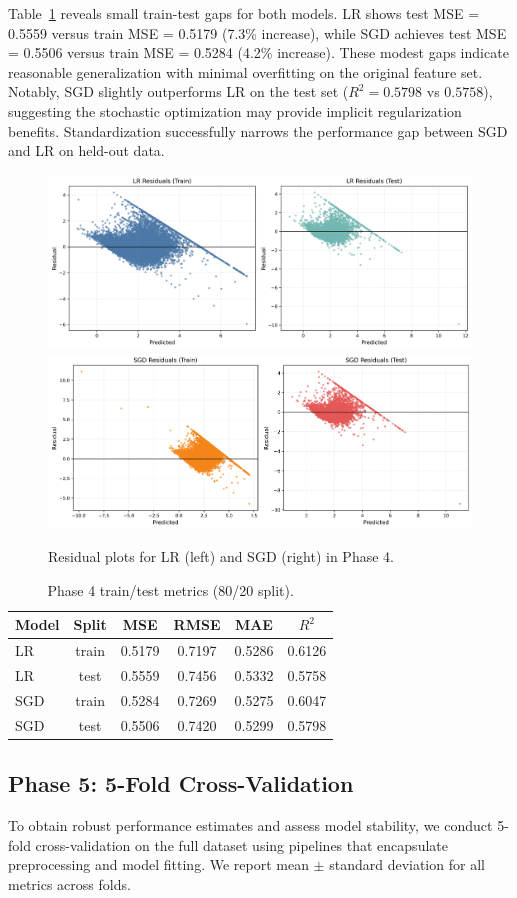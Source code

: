 \documentclass[runningheads]{llncs}
\begin{document}
Table~\ref{tab:phase4} reveals small train-test gaps for both models. LR shows test MSE = 0.5559 versus train MSE = 0.5179 (7.3\% increase), while SGD achieves test MSE = 0.5506 versus train MSE = 0.5284 (4.2\% increase). These modest gaps indicate reasonable generalization with minimal overfitting on the original feature set. Notably, SGD slightly outperforms LR on the test set ($R^2 = 0.5798$ vs $0.5758$), suggesting the stochastic optimization may provide implicit regularization benefits. Standardization successfully narrows the performance gap between SGD and LR on held-out data.

\begin{figure}[H]
  \centering
  \includegraphics[width=0.49\linewidth]{data/LR Residulas Phase 4.png}\hfill
  \includegraphics[width=0.49\linewidth]{data/SGD Residulas Phase 4.png}
  \caption{Residual plots for LR (left) and SGD (right) in Phase 4.}
  \label{fig:phase4-residuals}
\end{figure}

\begin{table}[H]
  \centering
  \caption{Phase 4 train/test metrics (80/20 split).}
  \label{tab:phase4}
  \begin{tabular}{lccccc}
    \toprule
    Model & Split & MSE & RMSE & MAE & $R^2$ \\
    \midrule
    LR  & train & 0.5179 & 0.7197 & 0.5286 & 0.6126 \\
    LR  & test  & 0.5559 & 0.7456 & 0.5332 & 0.5758 \\
    SGD & train & 0.5284 & 0.7269 & 0.5275 & 0.6047 \\
    SGD & test  & 0.5506 & 0.7420 & 0.5299 & 0.5798 \\
    \bottomrule
  \end{tabular}
\end{table}

\subsection{Phase 5: 5-Fold Cross-Validation}
To obtain robust performance estimates and assess model stability, we conduct 5-fold cross-validation on the full dataset using pipelines that encapsulate preprocessing and model fitting. We report mean $\pm$ standard deviation for all metrics across folds.
\end{document}
